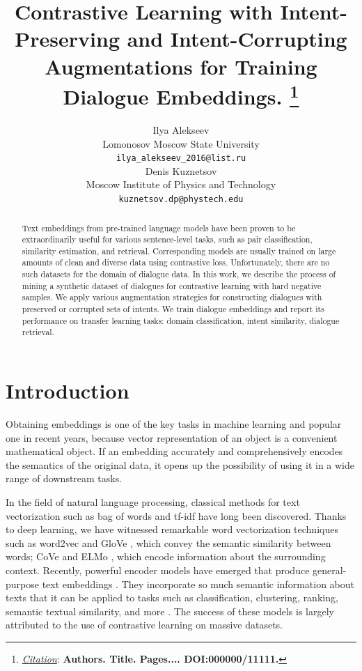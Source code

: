 \documentclass{article}
\title{Contrastive Learning with Intent-Preserving and Intent-Corrupting Augmentations for Training Dialogue Embeddings.
\thanks{\textit{\underline{Citation}}: 
\textbf{Authors. Title. Pages.... DOI:000000/11111.}} 
}
\author{
  Ilya Alekseev \\
  Lomonosov Moscow State University \\
  \texttt{ilya\_alekseev\_2016@list.ru} \\
   \And
  Denis Kuznetsov \\
  Moscow Institute of Physics and Technology \\
  \texttt{kuznetsov.dp@phystech.edu} \\
}
\begin{document}
\maketitle


\begin{abstract}
Text embeddings from pre-trained language models have been proven to be extraordinarily useful for various sentence-level tasks, such as pair classification, similarity estimation, and retrieval. Corresponding models are usually trained on large amounts of clean and diverse data using contrastive loss. Unfortunately, there are no such datasets for the domain of dialogue data. In this work, we describe the process of mining a synthetic dataset of dialogues for contrastive learning with hard negative samples. We apply various augmentation strategies for constructing dialogues with preserved or corrupted sets of intents. We train dialogue embeddings and report its performance on transfer learning tasks: domain classification, intent similarity, dialogue retrieval.
\end{abstract}




\section{Introduction}
Obtaining embeddings is one of the key tasks in machine learning and popular one in recent years, because vector representation of an object is a convenient mathematical object. If an embedding accurately and comprehensively encodes the semantics of the original data, it opens up the possibility of using it in a wide range of downstream tasks.

In the field of natural language processing, classical methods for text vectorization such as bag of words \cite{bow} and tf-idf \cite{SprckJones2021ASI} have long been discovered. Thanks to deep learning, we have witnessed remarkable word vectorization techniques such as word2vec \cite{mikolov2013efficient} and GloVe \cite{pennington-etal-2014-glove}, which convey the semantic similarity between words; CoVe \cite{mccann2018learned} and ELMo \cite{peters-etal-2018-deep}, which encode information about the surrounding context. Recently, powerful encoder models have emerged that produce general-purpose text embeddings \cite{xiao2023cpack, wang2022text, li2023general}. They incorporate so much semantic information about texts that it can be applied to tasks such as classification, clustering, ranking, semantic textual similarity, and more \cite{muennighoff2023mteb}. The success of these models is largely attributed to the use of contrastive learning on massive datasets. 
\end{document}
